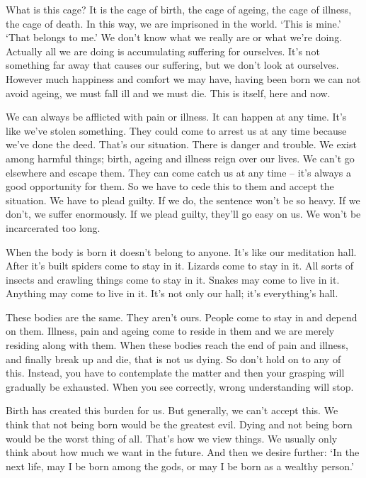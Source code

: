 What is this cage? It is the cage of birth, the cage of ageing, the cage of illness, the cage of death. In this way, we are imprisoned in the world. `This is mine.' `That belongs to me.' We don't know what we really are or what we're doing. Actually all we are doing is accumulating suffering for ourselves. It's not something far away that causes our suffering, but we don't look at ourselves. However much happiness and comfort we may have, having been born we can not avoid ageing, we must fall ill and we must die. This is  itself, here and now. 

We can always be afflicted with pain or illness. It can happen at any time. It's like we've stolen something. They could come to arrest us at any time because we've done the deed. That's our situation. There is danger and trouble. We exist among harmful things; birth, ageing and illness reign over our lives. We can't go elsewhere and escape them. They can come catch us at any time -- it's always a good opportunity for them. So we have to cede this to them and accept the situation. We have to plead guilty. If we do, the sentence won't be so heavy. If we don't, we suffer enormously. If we plead guilty, they'll go easy on us. We won't be incarcerated too long. 

When the body is born it doesn't belong to anyone. It's like our meditation hall. After it's built spiders come to stay in it. Lizards come to stay in it. All sorts of insects and crawling things come to stay in it. Snakes may come to live in it. Anything may come to live in it. It's not only our hall; it's everything's hall. 

These bodies are the same. They aren't ours. People come to stay in and depend on them. Illness, pain and ageing come to reside in them and we are merely residing along with them. When these bodies reach the end of pain and illness, and finally break up and die, that is not us dying. So don't hold on to any of this. Instead, you have to contemplate the matter and then your grasping will gradually be exhausted. When you see correctly, wrong understanding will stop. 

Birth has created this burden for us. But generally, we can't accept this. We think that not being born would be the greatest evil. Dying and not being born would be the worst thing of all. That's how we view things. We usually only think about how much we want in the future. And then we desire further: `In the next life, may I be born among the gods, or may I be born as a wealthy person.' 

